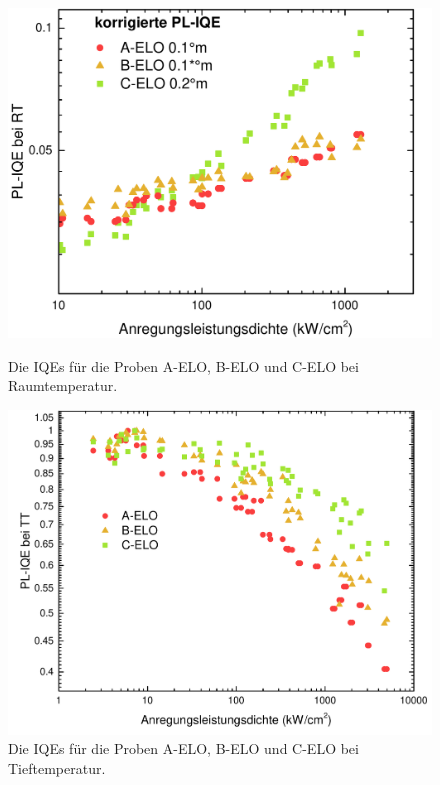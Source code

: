 \begin{figure}[H]
  \centering
  \begin{minipage}[t]{0.49\textwidth}
    \centering
    \includegraphics[width=\textwidth]{Bilder/TS4045/corrIQERT.pdf}
		\caption{Die IQEs für die Proben A-ELO, B-ELO und C-ELO bei Raumtemperatur.}
    \label{fig:eloiqeRT}
  \end{minipage}
	\hfill
  \begin{minipage}[t]{0.49\textwidth}
    \centering
    \includegraphics[width=\linewidth]{Bilder/TS4045/IQETT.pdf}
		\caption{Die IQEs für die Proben A-ELO, B-ELO und C-ELO bei Tieftemperatur.}
    \label{fig:elocorriqeRT}
  \end{minipage}
\end{figure}
